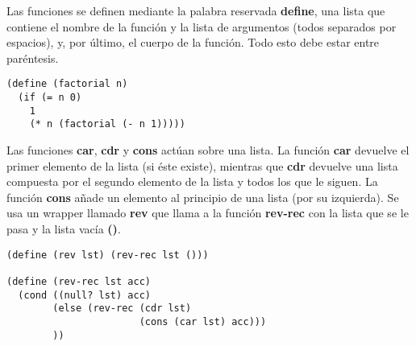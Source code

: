 Las funciones se definen mediante la palabra reservada \textbf{define}, una lista que contiene el nombre de la funci\'on y la lista de argumentos (todos separados por espacios), y, por \'ultimo, el cuerpo de la funci\'on. Todo esto debe estar entre par\'entesis.\\

\begin{minipage}{\linewidth}
\begin{small}
\begin{lstlisting}[frame=single]
(define (factorial n)
  (if (= n 0)
    1
    (* n (factorial (- n 1)))))
\end{lstlisting}
\end{small}
\end{minipage}

Las funciones \textbf{car}, \textbf{cdr} y \textbf{cons} act\'uan sobre una lista. La funci\'on \textbf{car} devuelve el primer elemento de la lista (si \'este existe), mientras que \textbf{cdr} devuelve una lista compuesta por el segundo elemento de la lista y todos los que le siguen. La funci\'on \textbf{cons} a\~nade un elemento al principio de una lista (por su izquierda). Se usa un wrapper llamado \textbf{rev} que llama a la funci\'on \textbf{rev-rec} con la lista que se le pasa y la lista vac\'ia \textbf{()}.\\

\begin{minipage}{\linewidth}
\begin{small}
\begin{lstlisting}[frame=single]
(define (rev lst) (rev-rec lst ()))

(define (rev-rec lst acc)
  (cond ((null? lst) acc)
        (else (rev-rec (cdr lst)
                       (cons (car lst) acc)))
        ))
\end{lstlisting}
\end{small}
\end{minipage}



